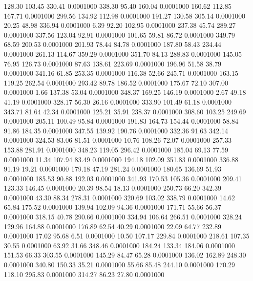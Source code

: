  128.30  103.45  330.41   0.0001000
 338.30   95.40  160.04   0.0001000
 160.62  112.85  167.71   0.0001000
 299.56  134.92  112.98   0.0001000
 191.27  130.58  305.14   0.0001000
  20.25   48.98  336.94   0.0001000
   6.39   92.20  102.95   0.0001000
 237.38   45.74  289.27   0.0001000
 337.56  123.04   92.91   0.0001000
 101.65   59.81   86.72   0.0001000
 349.79   68.59  200.53   0.0001000
 201.93   78.44   84.78   0.0001000
 187.80   58.43  234.44   0.0001000
 261.13  114.67  359.29   0.0001000
 351.70   84.13  288.83   0.0001000
 145.05   76.95  126.73   0.0001000
  87.63  138.61  223.69   0.0001000
 196.96   51.58   38.79   0.0001000
 341.16   61.85  253.35   0.0001000
 116.38   52.66  245.71   0.0001000
 163.15  119.25  262.54   0.0001000
 293.42   89.78  186.52   0.0001000
 175.67   72.10  307.00   0.0001000
   1.66  137.38   53.04   0.0001000
 348.37  169.25  146.19   0.0001000
   2.67   49.18   41.19   0.0001000
 328.17   56.30   26.16   0.0001000
 333.90  101.49   61.18   0.0001000
 343.71   81.64   42.34   0.0001000
 125.21   35.91  238.37   0.0001000
 308.60  103.25  249.69   0.0001000
 205.11  100.49   95.84   0.0001000
 191.83  164.73  154.44   0.0001000
  58.84   91.86  184.35   0.0001000
 347.55  139.92  190.76   0.0001000
 332.36   91.63  342.14   0.0001000
 324.53   83.06   81.51   0.0001000
  10.76  108.26   72.07   0.0001000
 257.33  153.88  281.91   0.0001000
 348.23  119.05  296.42   0.0001000
 185.04   69.13   77.59   0.0001000
  11.34  107.94   83.49   0.0001000
 194.18  102.09  351.83   0.0001000
 336.88   91.19   19.21   0.0001000
 179.18   47.19  281.24   0.0001000
 180.65  136.69   51.93   0.0001000
 185.53   90.88  192.03   0.0001000
 341.93  170.53  105.36   0.0001000
 209.41  123.33  146.45   0.0001000
  20.39   98.54   18.13   0.0001000
 250.73   66.20  342.39   0.0001000
  43.30   88.34  278.31   0.0001000
 320.69  103.02  338.79   0.0001000
  14.62   65.84  175.52   0.0001000
 139.94  102.09   94.36   0.0001000
 171.71   55.66   56.37   0.0001000
 318.15   40.78  290.66   0.0001000
 334.94  106.64  266.51   0.0001000
 328.24  129.96  164.88   0.0001000
 176.89   62.54   40.29   0.0001000
  22.09   64.77  232.89   0.0001000
  17.02   95.68    6.51   0.0001000
  10.50  107.17  229.84   0.0001000
 218.61  107.35   30.55   0.0001000
  63.92   31.66  348.46   0.0001000
 184.24  133.34  184.06   0.0001000
 151.53   66.33  303.55   0.0001000
 145.29   84.47   65.28   0.0001000
 136.02  162.89  248.30   0.0001000
 340.80  150.33   35.21   0.0001000
  55.66   85.48  244.10   0.0001000
 170.29  118.10  295.83   0.0001000
 314.27   86.23   27.80   0.0001000
